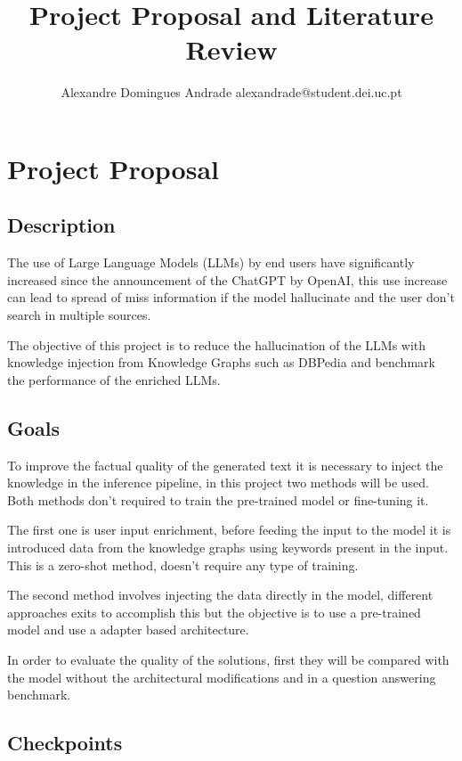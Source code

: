 \documentclass{article}
\title{Project Proposal and Literature Review}
\author{
    Alexandre Domingues Andrade
    \emails
    alexandrade@student.dei.uc.pt
}
\begin{document}
\maketitle

\section{Project Proposal}

\subsection{Description}

The use of Large Language Models (LLMs) by end users have significantly increased since the announcement of the ChatGPT by OpenAI, this use increase can lead to spread of miss information if the model hallucinate and the user don't search in multiple sources.

The objective of this project is to reduce the hallucination of the LLMs with knowledge injection from Knowledge Graphs such as DBPedia and benchmark the performance of the enriched LLMs.

\subsection{Goals}

To improve the factual quality of the generated text it is necessary to inject the knowledge in the inference pipeline, in this project two methods will be used. Both methods don't required to train the pre-trained model or fine-tuning it.

The first one is user input enrichment, before feeding the input to the model it is introduced data from the knowledge graphs using keywords present in the input. This is a zero-shot method, doesn't require any type of training.

The second method involves injecting the data directly in the model, different approaches exits to accomplish this but the objective is to use a pre-trained model and use a adapter based architecture.

In order to evaluate the quality of the solutions, first they will be compared with the model without the architectural modifications and in a question answering benchmark.

\subsection{Checkpoints}
\end{document}
